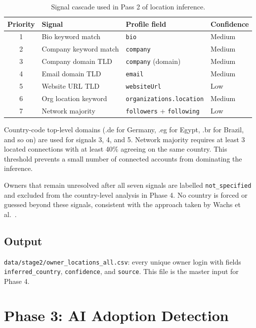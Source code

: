\documentclass[12pt, a4paper]{article}
\begin{document}
\begin{table}[h]
\centering
\caption{Signal cascade used in Pass 2 of location inference.}
\begin{tabular}{@{}clll@{}}
\toprule
\textbf{Priority} & \textbf{Signal} & \textbf{Profile field} & \textbf{Confidence} \\
\midrule
1 & Bio keyword match      & \texttt{bio}                      & Medium \\
2 & Company keyword match  & \texttt{company}                  & Medium \\
3 & Company domain TLD     & \texttt{company} (domain)         & Medium \\
4 & Email domain TLD       & \texttt{email}                    & Medium \\
5 & Website URL TLD        & \texttt{websiteUrl}               & Low    \\
6 & Org location keyword   & \texttt{organizations.location}   & Medium \\
7 & Network majority       & \texttt{followers} + \texttt{following} & Low \\
\bottomrule
\end{tabular}
\end{table}

Country-code top-level domains (.de for Germany, .eg for Egypt, .br for
Brazil, and so on) are used for signals 3, 4, and 5. Network majority
requires at least 3 located connections with at least 40\% agreeing on the
same country. This threshold prevents a small number of connected accounts
from dominating the inference.

Owners that remain unresolved after all seven signals are labelled
\texttt{not\_specified} and excluded from the country-level analysis in
Phase 4. No country is forced or guessed beyond these signals, consistent
with the approach taken by Wachs et al.~\cite{wachs2022}.

\subsection{Output}

\texttt{data/stage2/owner\_locations\_all.csv}: every unique owner login with
fields \texttt{inferred\_country}, \texttt{confidence}, and \texttt{source}.
This file is the master input for Phase 4.

\section{Phase 3: AI Adoption Detection}
\end{document}
